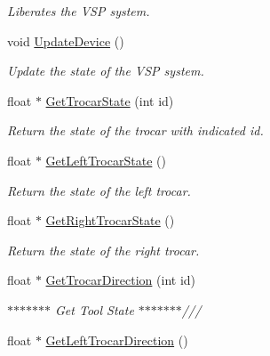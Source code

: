 \begin{DoxyCompactItemize}
\begin{DoxyCompactList}\small\item\em Liberates the VSP system. \item\end{DoxyCompactList}\item 
\hypertarget{classvtkIHP_a34e27f626efe2aa7194b636e6b25a1f4}{
void \hyperlink{classvtkIHP_a34e27f626efe2aa7194b636e6b25a1f4}{UpdateDevice} ()}
\label{classvtkIHP_a34e27f626efe2aa7194b636e6b25a1f4}

\begin{DoxyCompactList}\small\item\em Update the state of the VSP system. \item\end{DoxyCompactList}\item 
float $\ast$ \hyperlink{classvtkIHP_aea98689cc76883453f1b0099609cdaac}{GetTrocarState} (int id)
\begin{DoxyCompactList}\small\item\em Return the state of the trocar with indicated id. \item\end{DoxyCompactList}\item 
\hypertarget{classvtkIHP_a40db49901c5293fe66c97c9442d13ae0}{
float $\ast$ \hyperlink{classvtkIHP_a40db49901c5293fe66c97c9442d13ae0}{GetLeftTrocarState} ()}
\label{classvtkIHP_a40db49901c5293fe66c97c9442d13ae0}

\begin{DoxyCompactList}\small\item\em Return the state of the left trocar. \item\end{DoxyCompactList}\item 
\hypertarget{classvtkIHP_a4c11f6785733b96916b47a0b47fc2a81}{
float $\ast$ \hyperlink{classvtkIHP_a4c11f6785733b96916b47a0b47fc2a81}{GetRightTrocarState} ()}
\label{classvtkIHP_a4c11f6785733b96916b47a0b47fc2a81}

\begin{DoxyCompactList}\small\item\em Return the state of the right trocar. \item\end{DoxyCompactList}\item 
float $\ast$ \hyperlink{classvtkIHP_a51ffd1fb138d362a766df8de9e5ccbdb}{GetTrocarDirection} (int id)
\begin{DoxyCompactList}\small\item\em $\ast$$\ast$$\ast$$\ast$$\ast$$\ast$$\ast$ Get Tool State $\ast$$\ast$$\ast$$\ast$$\ast$$\ast$$\ast$/// \item\end{DoxyCompactList}\item 
\hypertarget{classvtkIHP_ad0d4f0c1ac2a4579e12265b1c6c66613}{
float $\ast$ \hyperlink{classvtkIHP_ad0d4f0c1ac2a4579e12265b1c6c66613}{GetLeftTrocarDirection} ()}
\label{classvtkIHP_ad0d4f0c1ac2a4579e12265b1c6c66613}


\end{DoxyCompactItemize}
